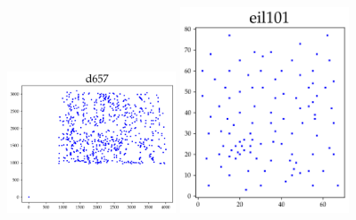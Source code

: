 \begin{appendices}
\begin{figure}[H]
\includegraphics[width=5cm]{../tsplib_euc2d_pictures_of_instances/d657.png}
\includegraphics[width=5cm]{../tsplib_euc2d_pictures_of_instances/eil101.png}
\end{figure}


\end{appendices}
